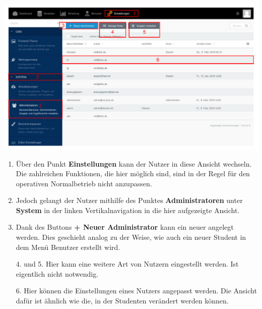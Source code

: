   \includegraphics[scale=0.3]{backend/img/settings_1.pdf}
  \begin{enumerate}
   \item Über den Punkt \textbf{Einstellungen} kann der Nutzer in diese Ansicht wechseln.
	 Die zahlreichen Funktionen, die hier möglich sind, sind in der Regel für den operativen Normalbetrieb nicht anzupassen.
   \item Jedoch gelangt der Nutzer mithilfe des Punktes \textbf{Administratoren} unter \textbf{System} in der linken Vertikalnavigation in die hier aufgezeigte Ansicht.
   \item Dank des Buttons \textbf{+ Neuer Administrator} kann ein neuer angelegt werden. 
	 Dies geschieht analog zu der Weise, wie auch ein neuer Student in dem Menü Benutzer erstellt wird.
   \item[4. und 5.] Hier kann eine weitere Art von Nutzern eingestellt werden. Ist eigentlich nicht notwendig.
   \item[6.] Hier können die Einstellungen eines Nutzers angepasst werden. 
	 Die Ansicht dafür ist ähnlich wie die, in der Studenten verändert werden können.
  \end{enumerate}

    